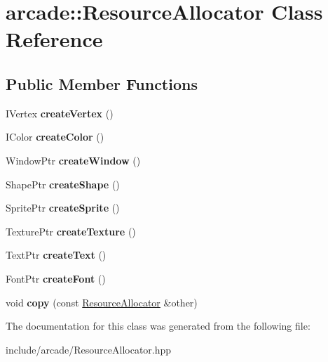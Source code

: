 \hypertarget{classarcade_1_1_resource_allocator}{}\section{arcade\+::Resource\+Allocator Class Reference}
\label{classarcade_1_1_resource_allocator}
\subsection*{Public Member Functions}
\begin{DoxyCompactItemize}
\item 
\mbox{\label{classarcade_1_1_resource_allocator_a250e2b9659cedf64df6149a085b6b1b6}} 
I\+Vertex {\bfseries create\+Vertex} ()
\item 
\mbox{\label{classarcade_1_1_resource_allocator_a76ca5b7ed805a0275aa0fa4648f65cfd}} 
I\+Color {\bfseries create\+Color} ()
\item 
\mbox{\label{classarcade_1_1_resource_allocator_ac3efcc82d883f0d1e3d3ddc1946224f8}} 
Window\+Ptr {\bfseries create\+Window} ()
\item 
\mbox{\label{classarcade_1_1_resource_allocator_a5d43eb29fff506b67d9c3288fe3bbcb3}} 
Shape\+Ptr {\bfseries create\+Shape} ()
\item 
\mbox{\label{classarcade_1_1_resource_allocator_a079ca9f77f6bc047b3e8e65268e8127b}} 
Sprite\+Ptr {\bfseries create\+Sprite} ()
\item 
\mbox{\label{classarcade_1_1_resource_allocator_a6cf9f4e30e13346fac5f840288639554}} 
Texture\+Ptr {\bfseries create\+Texture} ()
\item 
\mbox{\label{classarcade_1_1_resource_allocator_a2989abf5dd15a3c49370d4f690cea1f3}} 
Text\+Ptr {\bfseries create\+Text} ()
\item 
\mbox{\label{classarcade_1_1_resource_allocator_aa8e82a3e78d97e6a486e4d0ff63e67b9}} 
Font\+Ptr {\bfseries create\+Font} ()
\item 
\mbox{\label{classarcade_1_1_resource_allocator_a6a584ca728d47ece1f2356c519fd7043}} 
void {\bfseries copy} (const \mbox{\hyperlink{classarcade_1_1_resource_allocator}{Resource\+Allocator}} \&other)
\end{DoxyCompactItemize}


The documentation for this class was generated from the following file\+:\begin{DoxyCompactItemize}
\item 
include/arcade/Resource\+Allocator.\+hpp\end{DoxyCompactItemize}
